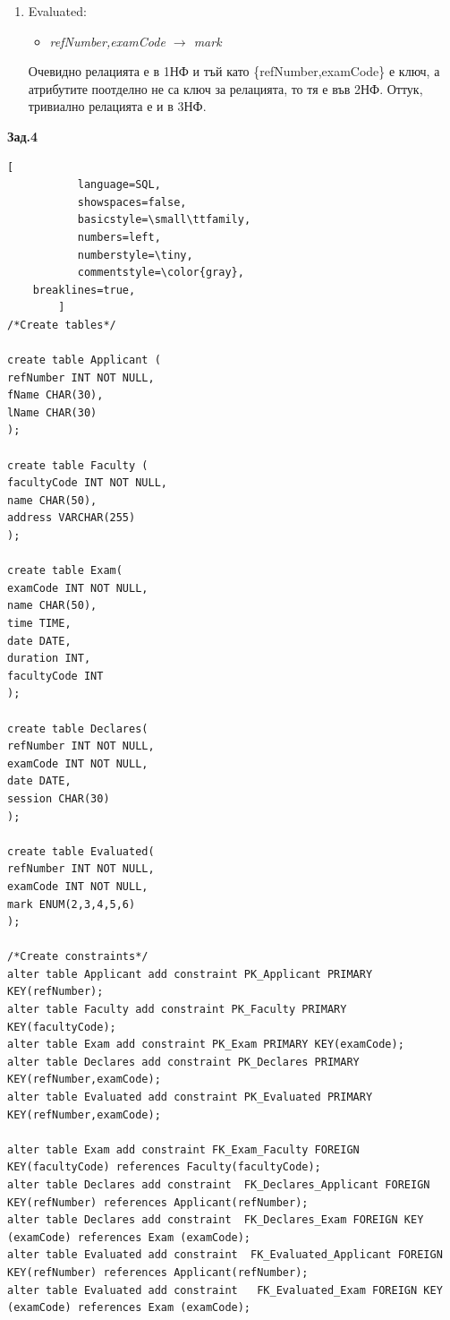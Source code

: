 \documentclass[a4paper,12pt]{article}
\begin{document}
\begin{enumerate}
\begin{itemize}
\item \textit{refNumber,examCode $\rightarrow$ date, session}
\item \textit{refNumber,examCode, date $\rightarrow$ session}
\item \textit{refNumber,examCode, session $\rightarrow$ date}
\end{itemize}
Атомарност  $\longrightarrow$ 1НФ; \{refNumber,examCode\} - ключ, всички атрибути зависят от него, но не и от негово подмножество $\longrightarrow$  2НФ. Лесно се проверява, че релацията е и в 3НФ.\\
\item Evaluated: 
\begin{itemize}
\item \textit{refNumber,examCode $\rightarrow$ mark}
\end{itemize}
Очевидно релацията е в 1НФ и тъй като \{refNumber,examCode\} е ключ, а атрибутите поотделно не са ключ за релацията, то тя е във 2НФ. Оттук, тривиално релацията е и в 3НФ. 
\end{enumerate}

\textbf {Зад.4}
\begin{lstlisting}[
           language=SQL,
           showspaces=false,
           basicstyle=\small\ttfamily,
           numbers=left,
           numberstyle=\tiny,
           commentstyle=\color{gray},
	breaklines=true,
        ]
/*Create tables*/

create table Applicant (
refNumber INT NOT NULL,
fName CHAR(30),
lName CHAR(30)
);

create table Faculty (
facultyCode INT NOT NULL,
name CHAR(50),
address VARCHAR(255)
);

create table Exam(
examCode INT NOT NULL,
name CHAR(50),
time TIME,
date DATE,
duration INT,
facultyCode INT
);

create table Declares(
refNumber INT NOT NULL,
examCode INT NOT NULL,
date DATE,
session CHAR(30) 
);

create table Evaluated(
refNumber INT NOT NULL,
examCode INT NOT NULL,
mark ENUM(2,3,4,5,6)
);

/*Create constraints*/
alter table Applicant add constraint PK_Applicant PRIMARY KEY(refNumber);
alter table Faculty add constraint PK_Faculty PRIMARY KEY(facultyCode);
alter table Exam add constraint PK_Exam PRIMARY KEY(examCode);
alter table Declares add constraint PK_Declares PRIMARY KEY(refNumber,examCode);
alter table Evaluated add constraint PK_Evaluated PRIMARY KEY(refNumber,examCode);

alter table Exam add constraint FK_Exam_Faculty FOREIGN KEY(facultyCode) references Faculty(facultyCode);
alter table Declares add constraint  FK_Declares_Applicant FOREIGN KEY(refNumber) references Applicant(refNumber);
alter table Declares add constraint  FK_Declares_Exam FOREIGN KEY (examCode) references Exam (examCode);
alter table Evaluated add constraint  FK_Evaluated_Applicant FOREIGN KEY(refNumber) references Applicant(refNumber);
alter table Evaluated add constraint   FK_Evaluated_Exam FOREIGN KEY (examCode) references Exam (examCode);
\end{lstlisting}
\end{document}
